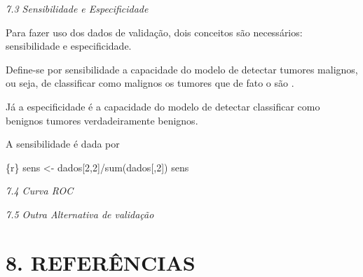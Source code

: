 \documentclass[
]{article}
\begin{document}
\emph{7.3 Sensibilidade e Especificidade}

Para fazer uso dos dados de validação, dois conceitos são necessários:
sensibilidade e especificidade.

Define-se por sensibilidade a capacidade do modelo de detectar tumores
malignos, ou seja, de classificar como malignos os tumores que de fato o
são .

Já a especificidade é a capacidade do modelo de detectar classificar
como benignos tumores verdadeiramente benignos.

A sensibilidade é dada por

\{r\} sens \textless- dados{[}2,2{]}/sum(dados{[},2{]}) sens

\emph{7.4 Curva ROC}

\emph{7.5 Outra Alternativa de validação}

\hypertarget{referuxeancias}{%
\section{8. REFERÊNCIAS}\label{referuxeancias}}
\end{document}
